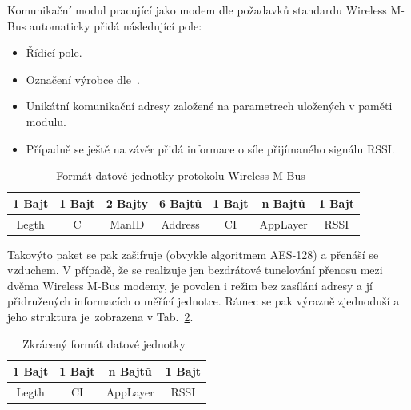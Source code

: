 Komunikační modul pracující jako modem dle požadavků standardu Wireless M-Bus automaticky přidá následující pole:

\begin{itemize}
	\item Řídicí pole.
\item Označení výrobce dle~\cite{WmbusVendors}.
\item Unikátní komunikační adresy založené na parametrech uložených v paměti modulu.
\item Případně se ještě na závěr přidá informace o síle přijímaného signálu RSSI.
\end{itemize}



\begin{table}[!ht]
\centering
\begin{tabular}{ccccccc}
1 Bajt & 1 Bajt & 2 Bajty & 6 Bajtů & 1 Bajt & n Bajtů & 1 Bajt \\ \hline
\multicolumn{1}{|c|}{Legth} & \multicolumn{1}{c|}{C} & \multicolumn{1}{c|}{ManID} & \multicolumn{1}{c|}{Address} & \multicolumn{1}{c|}{CI} & \multicolumn{1}{c|}{AppLayer} & \multicolumn{1}{c|}{RSSI} \\ \hline
\end{tabular}
\caption{Formát datové jednotky protokolu Wireless M-Bus~\cite{FormatDatoveJednotky}}
\label{PaketWm2}
\vspace{-5pt}
\end{table}

Takovýto paket se pak zašifruje (obvykle algoritmem AES-128) a přenáší se vzduchem. V případě, že se realizuje jen bezdrátové tunelování přenosu mezi dvěma Wireless M-Bus modemy, je povolen i režim bez zasílání adresy a jí přidružených informacích o měřící jednotce. Rámec se pak výrazně zjednoduší a jeho struktura je~zobrazena v Tab.~\ref{PaketWm3}.

			
			\begin{table}[!ht]
			\vspace{-10pt}
\centering
\begin{tabular}{cccc}
1 Bajt & 1 Bajt & n Bajtů & 1 Bajt \\ \hline
\multicolumn{1}{|c|}{Legth} & \multicolumn{1}{c|}{CI} & \multicolumn{1}{c|}{AppLayer} & \multicolumn{1}{c|}{RSSI} \\ \hline
\end{tabular}
\caption{Zkrácený formát datové jednotky~\cite{FormatDatoveJednotky}}
\label{PaketWm3}
\vspace{-20pt}
\end{table}
			
